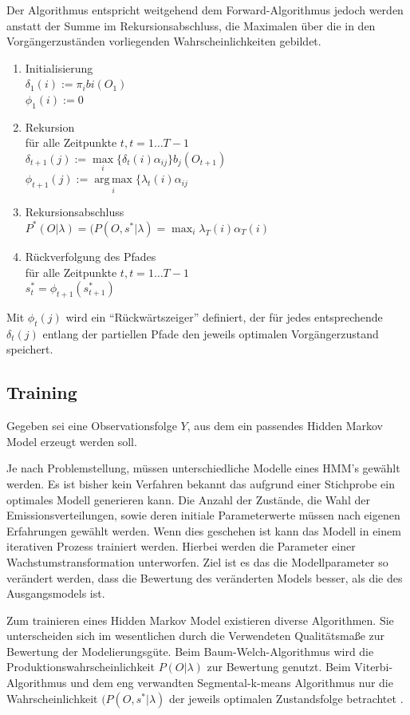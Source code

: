 Der Algorithmus entspricht weitgehend dem Forward-Algorithmus jedoch werden anstatt der Summe im Rekursionsabschluss, die Maximalen über die in den Vorgängerzuständen vorliegenden Wahrscheinlichkeiten gebildet.
\begin{enumerate}
  \item Initialisierung\\
		\(\delta_{1}(i) := \pi_{i}b{i}(O_{1})\)\\
		\(\phi_{1}(i):=0\)
  \item Rekursion\\
	für alle Zeitpunkte \(t, t=1 \ldots T-1\)\\
	\(\delta_{t+1}(j) :=
	\max\limits_{i}\{\delta_{t}(i)\alpha_{ij}\}b_{j}(O_{t+1})\)\\
	\(\phi_{t+1}(j):= \operatorname{arg\,max}\limits_{i}\{\lambda_{t}(i)\alpha_{ij} \)
  \item Rekursionsabschluss\\
  	\(P^{*}(O|\lambda) = (P(O,s^{*}|\lambda) = \max_{i}\lambda_{T}(i)
  	\alpha_{T}(i)\)
  \item Rückverfolgung des Pfades\\
	für alle Zeitpunkte \(t, t=1 \ldots T-1\)\\
	\(s_{t}^{*}=\phi_{t+1}(s_{t+1}^{*})\)
\end{enumerate}
Mit $\phi_{t}(j)$ wird ein ``Rückwärtszeiger'' definiert, der für jedes
entsprechende $\delta_{t}(j)$ entlang der partiellen Pfade den jeweils
optimalen Vorgängerzustand speichert.


\subsection{Training}
\label{sec:train}
Gegeben sei eine Observationsfolge $Y$, aus dem ein passendes Hidden Markov Model erzeugt werden soll. 

Je nach Problemstellung, müssen unterschiedliche Modelle eines HMM's gewählt werden. Es ist bisher kein Verfahren bekannt das aufgrund einer Stichprobe ein optimales Modell generieren kann. Die Anzahl der Zustände, die Wahl der Emissionsverteilungen, sowie deren initiale Parameterwerte müssen nach eigenen Erfahrungen gewählt werden. Wenn dies geschehen ist kann das Modell in einem iterativen Prozess trainiert werden. Hierbei werden die Parameter einer Wachstumstransformation unterworfen. Ziel ist es das die Modellparameter so verändert werden, dass die Bewertung des veränderten Models besser, als die des Ausgangsmodels ist.

Zum trainieren eines Hidden Markov Model existieren diverse Algorithmen. Sie unterscheiden sich im wesentlichen durch die Verwendeten Qualitätsmaße zur Bewertung der Modelierungsgüte. Beim Baum-Welch-Algorithmus \cite{rabiner} wird die Produktionswahrscheinlichkeit \(P(O|\lambda)\) zur Bewertung genutzt. Beim Viterbi-Algorithmus \cite{viterbi} und dem eng verwandten Segmental-k-means Algorithmus \cite{juang} nur die Wahrscheinlichkeit \((P(O,s^{*}|\lambda)\) der jeweils optimalen Zustandsfolge betrachtet \cite{mmmFink}.
